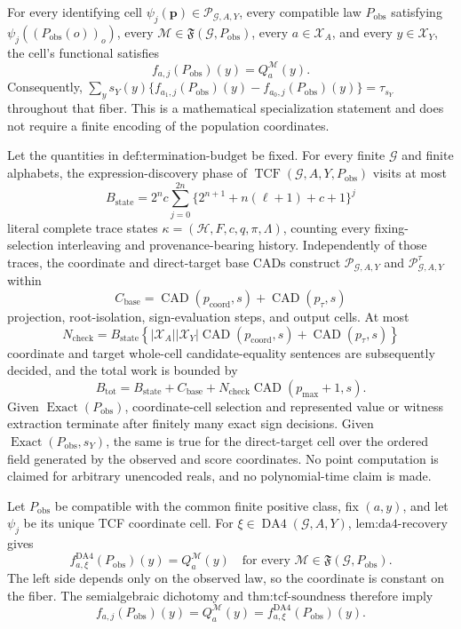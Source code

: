 For every identifying cell \(\psi_j(\mathbf p)\in\mathscr P_{\mathcal G,A,Y}\), every compatible law \(P_{\mathrm{obs}}\) satisfying \(\psi_j((P_{\mathrm{obs}}(o))_o)\), every \(\mathcal M\in\mathfrak F(\mathcal G,P_{\mathrm{obs}})\), every \(a\in\mathcal X_A\), and every \(y\in\mathcal X_Y\), the cell's functional satisfies \[f_{a,j}(P_{\mathrm{obs}})(y)=Q_a^{\mathcal M}(y).\] Consequently, \(\sum_y s_Y(y)\{f_{a_1,j}(P_{\mathrm{obs}})(y)-f_{a_0,j}(P_{\mathrm{obs}})(y)\}=\tau_{s_Y}\) throughout that fiber. This is a mathematical specialization statement and does not require a finite encoding of the population coordinates.

Let the quantities in \(\text{def:termination-budget}\) be fixed. For every finite \(\mathcal G\) and finite alphabets, the expression-discovery phase of \(\operatorname{TCF}(\mathcal G,A,Y,P_{\mathrm{obs}})\) visits at most
\[
B_{\mathrm{state}}=2^n c\sum_{j=0}^{2n}\bigl\{2^{n+1}+n(\ell+1)+c+1\bigr\}^j
\]
literal complete trace states \(\kappa=(\mathcal H,F,c,q,\pi,\Lambda)\), counting every fixing-selection interleaving and provenance-bearing history. Independently of those traces, the coordinate and direct-target base CADs construct \(\mathscr P_{\mathcal G,A,Y}\) and \(\mathscr P^{\tau}_{\mathcal G,A,Y}\) within
\[
C_{\mathrm{base}}=\operatorname{CAD}(p_{\mathrm{coord}},s)+\operatorname{CAD}(p_{\tau},s)
\]
projection, root-isolation, sign-evaluation steps, and output cells. At most
\[
N_{\mathrm{check}}=B_{\mathrm{state}}\left\{|\mathcal X_A||\mathcal X_Y|\operatorname{CAD}(p_{\mathrm{coord}},s)+\operatorname{CAD}(p_{\tau},s)\right\}
\]
coordinate and target whole-cell candidate-equality sentences are subsequently decided, and the total work is bounded by
\[
B_{\mathrm{tot}}=B_{\mathrm{state}}+C_{\mathrm{base}}+N_{\mathrm{check}}\operatorname{CAD}(p_{\max}+1,s).
\]
Given \(\operatorname{Exact}(P_{\mathrm{obs}})\), coordinate-cell selection and represented value or witness extraction terminate after finitely many exact sign decisions. Given \(\operatorname{Exact}(P_{\mathrm{obs}},s_Y)\), the same is true for the direct-target cell over the ordered field generated by the observed and score coordinates. No point computation is claimed for arbitrary unencoded reals, and no polynomial-time claim is made.

Let \(P_{\mathrm{obs}}\) be compatible with the common finite positive class, fix \((a,y)\), and let \(\psi_j\) be its unique TCF coordinate cell. For \(\xi\in\operatorname{DA4}(\mathcal G,A,Y)\), \(\text{lem:da4-recovery}\) gives
\[
f^{\mathrm{DA4}}_{a,\xi}(P_{\mathrm{obs}})(y)
=Q_a^{\mathcal M}(y)
\quad\text{for every }\mathcal M\in\mathfrak F(\mathcal G,P_{\mathrm{obs}}).
\tag{1}
\]
The left side depends only on the observed law, so the coordinate is constant on the fiber. The semialgebraic dichotomy and \(\text{thm:tcf-soundness}\) therefore imply
\[
f_{a,j}(P_{\mathrm{obs}})(y)
=Q_a^{\mathcal M}(y)
=f^{\mathrm{DA4}}_{a,\xi}(P_{\mathrm{obs}})(y).
\tag{2}
\]


